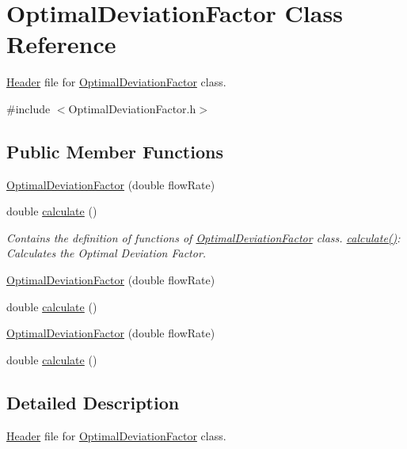 \hypertarget{class_optimal_deviation_factor}{}\section{Optimal\+Deviation\+Factor Class Reference}
\label{class_optimal_deviation_factor}


\hyperlink{class_header}{Header} file for \hyperlink{class_optimal_deviation_factor}{Optimal\+Deviation\+Factor} class.  




{\ttfamily \#include $<$Optimal\+Deviation\+Factor.\+h$>$}

\subsection*{Public Member Functions}
\begin{DoxyCompactItemize}
\item 
\hyperlink{class_optimal_deviation_factor_a61e6acfd31d44bc1f2f622407ba1e857}{Optimal\+Deviation\+Factor} (double flow\+Rate)
\item 
double \hyperlink{class_optimal_deviation_factor_aaa6687bb46d275c4cbcfe44caf895a37}{calculate} ()
\begin{DoxyCompactList}\small\item\em Contains the definition of functions of \hyperlink{class_optimal_deviation_factor}{Optimal\+Deviation\+Factor} class. \hyperlink{class_optimal_deviation_factor_aaa6687bb46d275c4cbcfe44caf895a37}{calculate()}\+: Calculates the Optimal Deviation Factor. \end{DoxyCompactList}\item 
\hyperlink{class_optimal_deviation_factor_a61e6acfd31d44bc1f2f622407ba1e857}{Optimal\+Deviation\+Factor} (double flow\+Rate)
\item 
double \hyperlink{class_optimal_deviation_factor_aaa6687bb46d275c4cbcfe44caf895a37}{calculate} ()
\item 
\hyperlink{class_optimal_deviation_factor_a61e6acfd31d44bc1f2f622407ba1e857}{Optimal\+Deviation\+Factor} (double flow\+Rate)
\item 
double \hyperlink{class_optimal_deviation_factor_aaa6687bb46d275c4cbcfe44caf895a37}{calculate} ()
\end{DoxyCompactItemize}


\subsection{Detailed Description}
\hyperlink{class_header}{Header} file for \hyperlink{class_optimal_deviation_factor}{Optimal\+Deviation\+Factor} class. 

